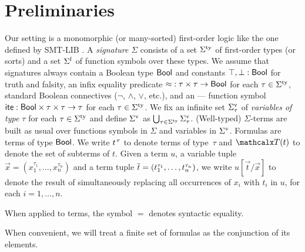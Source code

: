 
\section{Preliminaries}
\label{sec:prelim}

Our setting is a monomorphic (or many-sorted) first-order logic
like the one defined by SMT-LIB \cite{smtlib25}.
A \emph{signature} $\Sigma$ consists of
a set $\stypes{\Sigma}$ of %
first-order types
%
(or sorts) and a set $\sfuns{\Sigma}$ of function symbols over these types.
We assume that signatures always contain a Boolean type $\Bool$ and constants
$\ltrue, \lfalse : \Bool$ for truth and falsity,
an infix equality predicate ${\teq} : \tau \times \tau \to \Bool$
for each $\tau \in \stypes{\Sigma}$,
standard Boolean connectives ($\neg$, $\wedge$, $\vee$, etc.),
and an ---- function symbol
$\lite : \Bool \times \tau \times \tau \rightarrow \tau$
for each $\tau \in \stypes{\Sigma}$.
%
We fix an infinite set $\svars{\Sigma}_\tau$ of \emph{variables of type $\tau$}
for each $\tau \in \stypes{\Sigma}$ and
define $\svars{\Sigma}$ as $\bigcup_{\tau \in \stypes{\Sigma}} \svars{\Sigma}_\tau$.
(Well-typed) $\Sigma$-terms are built as usual over functions symbols in $\Sigma$ and variables in $\svars{\Sigma}$.
%
Formulas are terms of type $\Bool$.
We write $t\typ{\tau}$ to denote %
terms of type~$\tau$ and $\terms( t )$ to denote the set of subterms of $t$.
Given a term $u$, a variable tuple $\vec x = (x_1^{\tau_1},\dotsc,x_n^{\tau_n})$ and 
a term tuple $\vec t = (t_{\smash{1}\vphantom{n}}^{\tau_1},\dotsc,t_n^{\tau_n})$, 
we write $u[\vec t/\vec x]$ to denote the result of simultaneously replacing
all occurrences of $x_i$ with $t_i$ in $u$, for each $i=1,\dotsc,n$.
\begin{rep}When applied to terms, the symbol $=$ denotes syntactic equality.\end{rep}
When convenient, we will treat a finite set of formulas as the conjunction of its elements.

